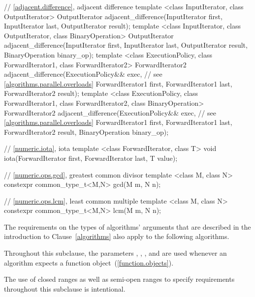 \begin{codeblock}
{  // \ref{adjacent.difference}, adjacent difference
  template <class InputIterator, class OutputIterator>
    OutputIterator adjacent_difference(InputIterator first,
                                       InputIterator last,
                                       OutputIterator result);
  template <class InputIterator, class OutputIterator, class BinaryOperation>
    OutputIterator adjacent_difference(InputIterator first,
                                       InputIterator last,
                                       OutputIterator result,
                                       BinaryOperation binary_op);
  template <class ExecutionPolicy, class ForwardIterator1, class ForwardIterator2>
    ForwardIterator2 adjacent_difference(ExecutionPolicy&& exec, // see \ref{algorithms.parallel.overloads}
                                         ForwardIterator1 first,
                                         ForwardIterator1 last,
                                         ForwardIterator2 result);
  template <class ExecutionPolicy, class ForwardIterator1, class ForwardIterator2,
            class BinaryOperation>
    ForwardIterator2 adjacent_difference(ExecutionPolicy&& exec, // see \ref{algorithms.parallel.overloads}
                                         ForwardIterator1 first,
                                         ForwardIterator1 last,
                                         ForwardIterator2 result,
                                         BinaryOperation binary_op);

  // \ref{numeric.iota}, iota
  template <class ForwardIterator, class T>
    void iota(ForwardIterator first, ForwardIterator last, T value);

  // \ref{numeric.ops.gcd}, greatest common divisor
  template <class M, class N>
    constexpr common_type_t<M,N> gcd(M m, N n);

  // \ref{numeric.ops.lcm}, least common multiple
  template <class M, class N>
    constexpr common_type_t<M,N> lcm(M m, N n);
}
\end{codeblock}

\pnum
The requirements on the types of algorithms' arguments that are
described in the introduction to Clause~\ref{algorithms} also
apply to the following algorithms.

\pnum
Throughout this subclause, the parameters
,
,
,
and 
are used
whenever an algorithm expects a function object~(\ref{function.objects}).

\pnum
\begin{note}
The use of closed ranges as well as semi-open ranges to specify requirements
throughout this subclause is intentional.
\end{note}

